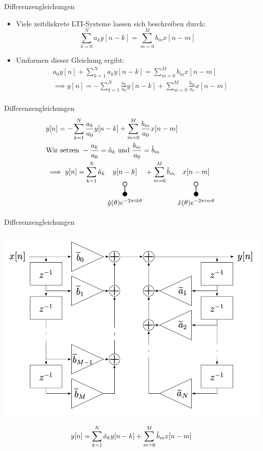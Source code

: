 \documentclass[14pt, aspectratio=169, handout]{beamer}
\newcommand{\verticaltransform}[4]{%
    \begin{tikzpicture}
        \filldraw[thick] (0,0) circle (0.1) node[below=3pt] {$#4$};
        \draw[thick] (0,0.1) -- (0,#2 -0.1) node[midway, left] {#1};
        \draw[thick] (0,#2) circle (0.1) node[above=3pt] {$#3$};
    \end{tikzpicture}%
}
\begin{document}
\begin{frame}{Differenzengleichungen}
    \begin{itemize}
        \item Viele zeitdiskrete LTI-Systeme lassen sich beschreiben durch:
        $$\sum_{k=0}^N a_k y[n-k] = \sum_{m=0}^M b_m x[n-m]$$
        \item Umformen dieser Gleichung ergibt:
        \begin{align*}
            &a_0 y[n] + \sum_{k=1}^N a_k y[n-k] = \sum_{m=0}^M b_m x[n-m]\\
            &\implies y[n] = -\sum_{k=1}^N \frac{a_k}{a_0}y[n-k] + \sum_{m=0}^M \frac{b_m}{a_0} x[n-m] \\
        \end{align*}
    \end{itemize}
\end{frame}

\begin{frame}{Differenzengleichungen}
    \begin{align*}
        &y[n] = -\sum_{k=1}^N \frac{a_k}{a_0}y[n-k] + \sum_{m=0}^M \frac{b_m}{a_0} x[n-m] \\
        &\text{Wir setzen } -\frac{a_k}{a_0} = \Tilde{a}_k \text{ und } \frac{b_m}{a_0} = \Tilde{b}_m \\
        &\implies y[n] = \sum_{k=1}^N \Tilde{a}_k \underset{\verticaltransform{}{0.5}{}{\hat{y}(\theta)e^{-2 \pi i k \theta}}}{y[n-k]} + \sum_{m=0}^M \Tilde{b}_m \underset{\verticaltransform{}{0.5}{}{\hat{x}(\theta)e^{-2 \pi i m \theta}}}{x[n-m]}
    \end{align*}
\end{frame}

\begin{frame}{Differenzengleichungen}
\vspace*{-0.25cm}
    \begin{center}
        \includegraphics[width=0.55\linewidth]{figures/Blockschaltbild2.png}
    \end{center}
    \vspace*{-0.25cm}
    $$y[n] = \sum_{k=1}^N \Tilde{a}_k y[n-k] + \sum_{m=0}^M \Tilde{b}_m x[n-m]$$
\end{frame}
\end{document}
